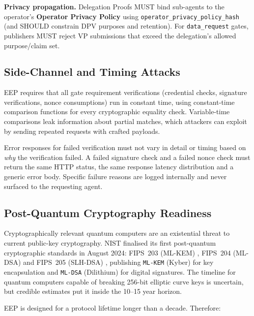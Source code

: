 \documentclass[12pt,a4paper]{article}
\begin{document}
\textbf{Privacy propagation.} Delegation Proofs MUST bind sub-agents to the operator's \textbf{Operator Privacy Policy} using \texttt{operator\_privacy\_policy\_hash} (and SHOULD constrain DPV purposes and retention). For \texttt{data\_request} gates, publishers MUST reject VP submissions that exceed the delegation's allowed purpose/claim set.

\subsection{Side-Channel and Timing Attacks}

EEP requires that all gate requirement verifications (credential checks, signature verifications, nonce consumptions) run in constant time, using constant-time comparison functions for every cryptographic equality check. Variable-time comparisons leak information about partial matches, which attackers can exploit by sending repeated requests with crafted payloads.

Error responses for failed verification must not vary in detail or timing based on \textit{why} the verification failed. A failed signature check and a failed nonce check must return the same HTTP status, the same response latency distribution and a generic error body. Specific failure reasons are logged internally and never surfaced to the requesting agent.

\subsection{Post-Quantum Cryptography Readiness}

Cryptographically relevant quantum computers are an existential threat to current public-key cryptography. NIST finalised its first post-quantum cryptographic standards in August 2024: FIPS~203 (ML-KEM) \cite{ref11}, FIPS~204 (ML-DSA) \cite{ref12} and FIPS~205 (SLH-DSA) \cite{ref13}, publishing \texttt{ML-KEM} (Kyber) for key encapsulation and \texttt{ML-DSA} (Dilithium) for digital signatures. The timeline for quantum computers capable of breaking 256-bit elliptic curve keys is uncertain, but credible estimates put it inside the 10--15 year horizon.

EEP is designed for a protocol lifetime longer than a decade. Therefore:
\end{document}
